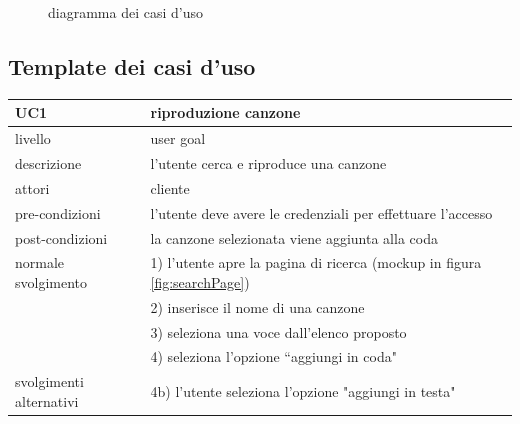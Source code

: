 \documentclass{article}
\begin{document}
  \begin{figure}[H]
    \centering
    
    \caption{diagramma dei casi d'uso}
    \label{fig:useCaseDiagram}
  \end{figure}



  \subsection{Template dei casi d'uso}

  \begin{table}[H]
    \centering
    \begin{tabular}{|l|l|}
      \hline
      \textbf{UC1} & \textbf{riproduzione canzone}\\
      \hline
      livello & user goal\\
      \hline
      descrizione & l'utente cerca e riproduce una canzone\\
      \hline
      attori & cliente\\
      \hline
      pre-condizioni & l'utente deve avere le credenziali per effettuare l'accesso\\
      \hline
      post-condizioni & la canzone selezionata viene aggiunta alla coda\\
      \hline
      normale svolgimento & 1) l'utente apre la pagina di ricerca (mockup in figura \ref{fig:searchPage})\\
      & 2) inserisce il nome di una canzone\\
      & 3) seleziona una voce dall'elenco proposto\\
      & 4) seleziona l'opzione ``aggiungi in coda"

      \\
      \hline
      svolgimenti alternativi & 4b) l'utente seleziona l'opzione "aggiungi in testa"\\
      \hline
    \end{tabular}
    \label{tab:uct1}
  \end{table}

  \vspace{40pt}
\end{document}
